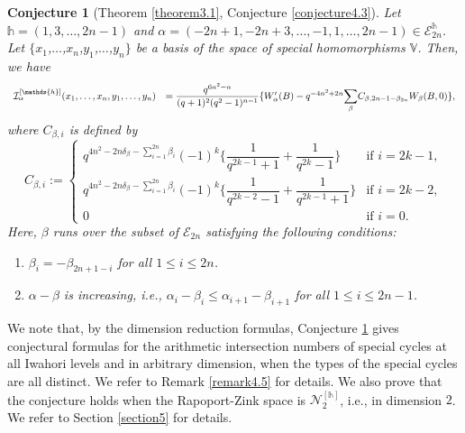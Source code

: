 \documentclass[11pt,oneside]{amsart}
\theoremstyle{plain}
\newtheorem{conjecture}[theorem]{Conjecture}
\theoremstyle{definition}
\theoremstyle{remark}
\newcommand{\tx}[1]{\text{#1}}
\newcommand{\BV}{{\mathbb V}}
\newcommand{\CE}{{\mathcal E}}
\newcommand{\CI}{{\mathcal I}}
\newcommand{\CN}{{\mathcal N}}
\numberwithin{equation}{section}
\begin{document}
	 \begin{conjecture}[Theorem \ref{theorem3.1}, Conjecture \ref{conjecture4.3}]\label{conjectureintro} 	Let $\mathds{h}=(1,3,\dots,2n-1)$ and $\alpha=(-2n+1,-2n+3,\dots,-1,1,\dots,2n-1) \in \CE_{2n}^{\mathds{h}}$. Let $\lbrace x_1$,$\dots$,$x_{n}$,$y_1$,$\dots$,$y_{n} \rbrace$ be a basis of the space of special homomorphisms $\BV$. Then, we have
	 		\begin{equation*}\begin{array}{ll}
	 			\CI_{\alpha}^{[\mathds{h}]}(x_1,\dots,x_{n},y_1,\dots,y_{n})
	 			&=\dfrac{q^{6n^2-n}}{(q+1)^2(q^2-1)^{n-1}}\lbrace W_{\alpha}'(B)-q^{-4n^2+2n}\mathlarger{\sum}_{\beta}C_{\beta,2n-1-\beta_{2n}}W_{\beta}(B,0) \rbrace,
	 		\end{array}
	 	\end{equation*}
	 	where $C_{\beta,i}$ is defined by
	 \begin{equation*}
	 	C_{\beta,i}:=\left\lbrace \begin{array}{ll}
	 		q^{4n^2-2n\delta_{\beta}-\sum_{i=1}^{2n} \beta_i}(-1)^k\lbrace \dfrac{1}{q^{2k-1}+1}+\dfrac{1}{q^{2k}-1} \rbrace & \tx{if }i=2k-1,\\
	 		q^{4n^2-2n\delta_{\beta}-\sum_{i=1}^{2n} \beta_i}(-1)^k\lbrace \dfrac{1}{q^{2k-2}-1}+\dfrac{1}{q^{2k-1}+1} \rbrace & \tx{if }i=2k-2,\\0 &\tx{if } i=0.
	 	\end{array}\right.
	 \end{equation*}
	 Here, $\beta$ runs over the subset of $\CE_{2n}$ satisfying the following conditions:
	 \begin{enumerate}
	 	\item $\beta_i=-\beta_{2n+1-i}$ for all $1 \leq i \leq 2n$.
	 	\item $\alpha-\beta$ is increasing, i.e., $\alpha_i-\beta_i \leq \alpha_{i+1}-\beta_{i+1}$ for all $1 \leq i \leq 2n-1$.
	 \end{enumerate}
	 \end{conjecture}
	 
	 We note that, by the dimension reduction formulas, Conjecture \ref{conjectureintro} gives conjectural formulas for the arithmetic intersection numbers of special cycles at all Iwahori levels and in arbitrary dimension, when the types of the special cycles are all distinct. We refer to Remark \ref{remark4.5} for details.  We also prove that the conjecture holds when the Rapoport-Zink space is $\CN_2^{[\mathds{h}]}$, i.e., in dimension $2$. We refer to Section \ref{section5} for details.
	 
\end{document}
